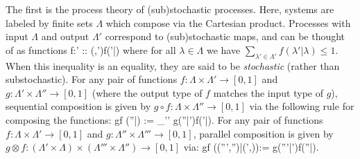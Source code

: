 \documentclass[onecolum,aps,groupedaddress,nofootinbib]{revtex4-2}
\begin{document}
The first is the process theory of (sub)stochastic processes. Here, systems are labeled by finite sets
$\Lambda$ which compose via the Cartesian product. Processes with input $\Lambda$ and output $\Lambda'$ correspond to (sub)stochastic maps, and can be thought of as functions
\beq
f:\Lambda\times\Lambda' \to [0,1] :: (\lambda,\lambda')\mapsto f(\lambda'|\lambda)
\eeq
where for all $\lambda\in\Lambda$ we have $\sum_{\lambda'\in\Lambda'} f(\lambda'|\lambda) \leq 1$. When this inequality is an equality, they are said to be {\em stochastic} (rather than substochastic).
For any pair of functions $f: \Lambda \times \Lambda'\to[0,1]$ and $g: \Lambda' \times \Lambda''\to[0,1]$ (where the output type of $f$ matches the input type of $g$), sequential composition is given by $g \circ f:\Lambda\times\Lambda''\to[0,1]$ via the following rule for composing the functions:
\beq
g\circ f (\lambda''|\lambda) := \sum_{\lambda'\in\Lambda'} g(\lambda''|\lambda')f(\lambda'|\lambda).
\eeq
For any pair of functions $f: \Lambda \times \Lambda'\to[0,1]$ and $g: \Lambda'' \times \Lambda'''\to[0,1]$, parallel composition is given by $g \otimes f:(\Lambda'\times\Lambda) \times (\Lambda'''\times\Lambda'')\to[0,1]$ via:
\beq
g\otimes f ((\lambda''',\lambda'')|(\lambda',\lambda)):= g(\lambda'''|\lambda')f(\lambda''|\lambda).
\eeq
\end{document}
